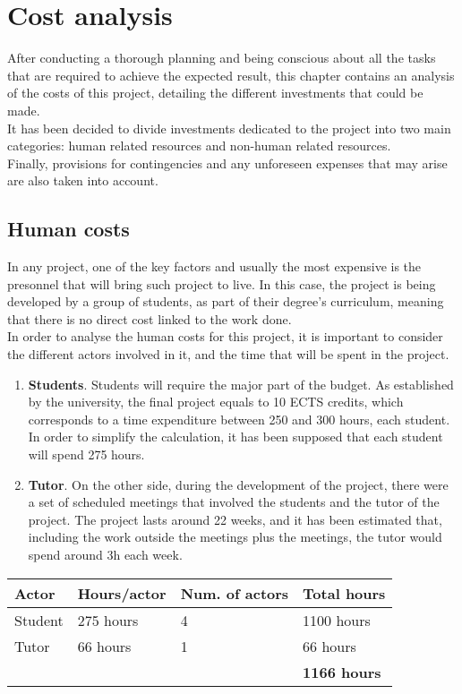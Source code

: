 \documentclass[../memory.tex]{subfiles}
\begin{document}
\chapter{Cost analysis}
After conducting a thorough planning and being conscious about all the tasks
that are required to achieve the expected result, this chapter contains an
analysis of the costs of this project, detailing the different investments that
could be made.
\\[8pt]
It has been decided to divide investments dedicated to the project into two main
categories: human related resources and non-human related resources.
\\[8pt]
Finally, provisions for contingencies and any unforeseen expenses that may arise
are also taken into account.
\section{Human costs}
In any project, one of the key factors and usually the most expensive is the
presonnel that will bring such project to live. In this case, the project is
being developed by a group of students, as part of their degree's curriculum,
meaning that there is no direct cost linked to the work done.
\\[8pt]
In order to analyse the human costs for this project, it is important to
consider the different actors involved in it, and the time that will be spent in
the project.
\begin{enumerate}
	\item\textbf{Students}. Students will require the major part of the budget. As
	established by the university, the final project equals to 10 ECTS credits,
	which corresponds to a time expenditure between 250 and 300 hours, each
	student. In order to simplify the calculation, it has been supposed that
	each student will spend 275 hours.
	\item\textbf{Tutor}. On the other side, during the development of the project,
	there were a set of scheduled meetings that involved the students and the
	tutor of the project. The project lasts around 22 weeks, and it has been
	estimated that, including the work outside the meetings plus the meetings,
	the tutor would spend around 3h each week.
\end{enumerate}
\vspace*{8pt}
\begin{tabularx}{\textwidth}{|X|X|X|X|}
	\hline
	\rowcolor{rowColor}
	Actor                 & Hours/actor         & Num. of actors & Total hours \\
	\hline
	Student               & 275 hours           & 4              & 1100 hours  \\
	\hline
	Tutor                 & 66 hours            & 1              & 66 hours    \\
	\hline
	\multicolumn{3}{X|}{} & \textbf{1166 hours}                                \\
	\cline{4-3}
\end{tabularx}
\end{document}
